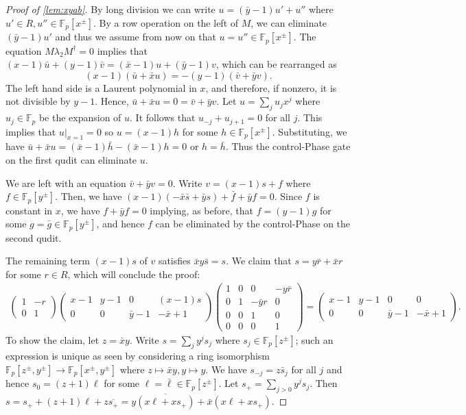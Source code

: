 \documentclass[aps,pra,
floatfix,notitlepage,
nofootinbib,
longbibliography,11pt]{revtex4-1}
\theoremstyle{definition}
\newcommand{\FF}{{\mathbb{F}}}
\begin{document}
\begin{proof}[Proof of \cref{lem:xyab}]
By long division we can write $u = (\bar y - 1)u' + u''$ where $u' \in R, u'' \in \FF_p[x^\pm]$.
By a row operation on the left of $M$, we can eliminate $(\bar y -1)u'$
and thus we assume from now on that $u = u'' \in \FF_p[x^\pm]$.
The equation $M \lambda_2 M^\dagger =0$ implies that
$
(x-1) \bar u + (y-1) \bar v = (\bar x -1) u + (\bar y -1) v
$, which can be rearranged as
\[
(x-1)(\bar u + \bar x u) = -(y-1) (\bar v + \bar y v).
\]
The left hand side is a Laurent polynomial in $x$,
and therefore, if nonzero, it is not divisible by $y-1$.
Hence, $\bar u + \bar x u = 0 = \bar v + \bar y v $.
Let $u = \sum_j u_j x^j$ where $u_j \in \FF_p$ be the expansion of $u$.
It follows that $u_{-j} + u_{j+1} = 0$ for all $j$.
This implies that $u|_{x=1} = 0$ so $u = (x-1)h$ for some $h \in \FF_p[x^\pm]$.
Substituting, we have $ \bar u + \bar x u = (\bar x -1 )\bar h - (\bar x -1) h = 0$ or $h = \bar h$.
Thus the control-Phase gate on the first qudit can eliminate $u$.

We are left with an equation $\bar v + \bar y v = 0$.
Write $v = (x-1)s + f$ where $f \in \FF_p[y^\pm]$.
Then, we have $(x-1)(-\bar x \bar s + \bar y s) + \bar f + \bar y f = 0$.
Since $f$ is constant in $x$, we have $f + \bar y f = 0$ 
implying, as before, that $f = (y-1)g$ for some $g = \bar g \in \FF_p[y^\pm]$,
and hence $f$ can be eliminated by the control-Phase on the second qudit.

The remaining term $(x-1)s$ of $v$ satisfies $\bar x y \bar s = s$.
We claim that $s = y \bar r + \bar x r$ for some $r \in R$,
which will conclude the proof:
\begin{align}
\begin{pmatrix}
1 & -r \\ 0 & 1
\end{pmatrix}
\begin{pmatrix}
x-1 & y-1 & 0 & (x-1)s \\
0   & 0   & \bar y -1 & -\bar x + 1
\end{pmatrix}
\begin{pmatrix}
1 & 0 & 0 & -y \bar r\\
0 & 1 & -\bar y r & 0\\
0 & 0 & 1 & 0 \\
0 & 0 & 0 & 1
\end{pmatrix}
=
\begin{pmatrix}
x-1 & y-1 & 0 & 0 \\
0   & 0   & \bar y -1 & -\bar x + 1
\end{pmatrix}.
\end{align}
To show the claim,
let $z = \bar x y$.
Write $s = \sum_j y^j s_j$ where $s_j \in \FF_p[z^\pm]$;
such an expression is unique as seen by considering a ring isomorphism 
$\FF_p[z^\pm,y^\pm] \to \FF_p[x^\pm,y^\pm]$
where $z \mapsto \bar x y, y \mapsto y$.
We have $s_{-j} = z \bar s_j$ for all $j$ and hence $s_0 = (z+1)\ell$ 
for some $\ell = \bar \ell \in \FF_p[z^\pm]$.
Let $s_+ = \sum_{j > 0} y^j s_j$.
Then $s = s_+  + (z+1)\ell + z \overline{ s_+} = y \overline{(x \ell + x s_+)} + \bar x (x \ell + x s_+)$.
\end{proof}
\end{document}
